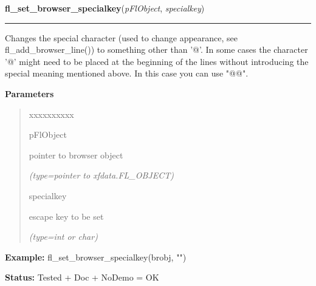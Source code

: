     \vspace{0.5ex}

\hspace{.8\funcindent}\begin{boxedminipage}{\funcwidth}

    \raggedright \textbf{fl\_set\_browser\_specialkey}(\textit{pFlObject}, \textit{specialkey})

    \vspace{-1.5ex}

    \rule{\textwidth}{0.5\fboxrule}
\setlength{\parskip}{2ex}
    Changes the special character (used to change appearance, see 
    fl\_add\_browser\_line()) to something other than '@'. In some cases 
    the character '@' might need to be placed at the beginning of the lines
    without introducing the special meaning mentioned above. In this case 
    you can use "@@".

\setlength{\parskip}{1ex}
      \textbf{Parameters}
      \vspace{-1ex}

      \begin{quote}
        \begin{Ventry}{xxxxxxxxxx}

          \item[pFlObject]

          pointer to browser object

            {\it (type=pointer to xfdata.FL\_OBJECT)}

          \item[specialkey]

          escape key to be set

            {\it (type=int or char)}

        \end{Ventry}

      \end{quote}

\textbf{Example:} fl\_set\_browser\_specialkey(brobj, "{\textbar}")



\textbf{Status:} Tested + Doc + NoDemo = OK



    \end{boxedminipage}

    \label{xformslib:flbrowser:fl_set_browser_vscrollbar}

